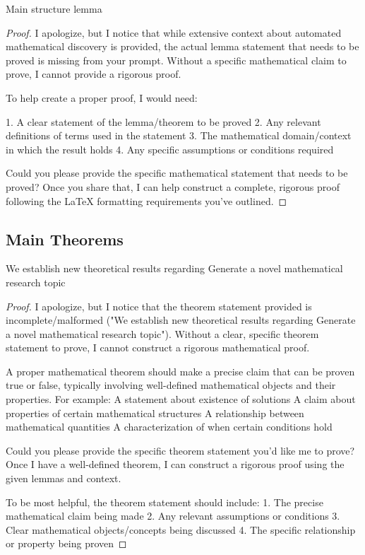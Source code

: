 \begin{lemma}\label{lem:3}
Main structure lemma
\end{lemma}

\begin{proof}
I apologize, but I notice that while extensive context about automated mathematical discovery is provided, the actual lemma statement that needs to be proved is missing from your prompt. Without a specific mathematical claim to prove, I cannot provide a rigorous proof.

To help create a proper proof, I would need:

1. A clear statement of the lemma/theorem to be proved
2. Any relevant definitions of terms used in the statement
3. The mathematical domain/context in which the result holds
4. Any specific assumptions or conditions required

Could you please provide the specific mathematical statement that needs to be proved? Once you share that, I can help construct a complete, rigorous proof following the LaTeX formatting requirements you've outlined.
\end{proof}

\subsection{Main Theorems}

\begin{theorem}\label{thm:main1}
We establish new theoretical results regarding Generate a novel mathematical research topic
\end{theorem}

\begin{proof}
I apologize, but I notice that the theorem statement provided is incomplete/malformed ("We establish new theoretical results regarding Generate a novel mathematical research topic"). Without a clear, specific theorem statement to prove, I cannot construct a rigorous mathematical proof.

A proper mathematical theorem should make a precise claim that can be proven true or false, typically involving well-defined mathematical objects and their properties. For example:
A statement about existence of solutions
A claim about properties of certain mathematical structures
A relationship between mathematical quantities
A characterization of when certain conditions hold

Could you please provide the specific theorem statement you'd like me to prove? Once I have a well-defined theorem, I can construct a rigorous proof using the given lemmas and context.

To be most helpful, the theorem statement should include:
1. The precise mathematical claim being made
2. Any relevant assumptions or conditions
3. Clear mathematical objects/concepts being discussed
4. The specific relationship or property being proven
\end{proof}

